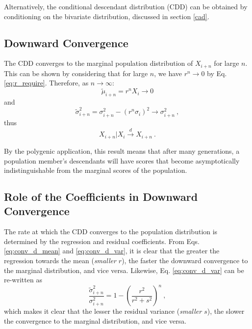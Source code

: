 \documentclass{svproc} %
\begin{document}
Alternatively, the conditional descendant distribution (CDD) can be obtained by conditioning on the bivariate distribution, discussed in section \ref{cad}.


\subsection{Downward Convergence}

The CDD converges to the marginal population distribution of $X_{i+n}$ for large $n$. This can be shown by considering that for large $n$, we have $r^n \rightarrow 0$ by Eq. \ref{eq:r_require}. Therefore, as $n \rightarrow \infty$:
\begin{equation}
\tilde{\mu}_{i+n} = r^nX_i \rightarrow 0 
\label{eq:conv_d_mean}
\end{equation}
and
\begin{equation}
\tilde{\sigma}_{i+n}^2 = \sigma_{i+n}^2 - (r^n \sigma_i)^2 \rightarrow \sigma_{i+n}^2 \ ,
\label{eq:conv_d_var}
\end{equation}
thus
\begin{equation}
X_{i+n}|X_i \xrightarrow{\overset{}{d}} X_{i+n} \ .
\label{eq:conv_d}
\end{equation}

By the polygenic application, this result means that after many generations, a population member's descendants will have scores that become asymptotically indistinguishable from the marginal scores of the population. 

\subsection{Role of the Coefficients in Downward Convergence} \label{role_down}

The rate at which the CDD converges to the population distribution is determined by the regression and residual coefficients. From Eqs. \ref{eq:conv_d_mean} and \ref{eq:conv_d_var}, it is clear that the greater the regression towards the mean (\emph{smaller $r$}), the faster the downward convergence to the marginal distribution, and vice versa. Likewise, Eq. \ref{eq:conv_d_var} can be re-written as 
\begin{equation}
\frac{\tilde{\sigma}_{i+n}^2}{\sigma_{i+n}^2} = 1 - (\frac{r^2}{r^2+s^2})^n \ ,
\label{eq:conv_d_var_ratio}
\end{equation}
which makes it clear that the lesser the residual variance (\emph{smaller $s$}), the slower the convergence to the marginal distribution, and vice versa.
\end{document}
